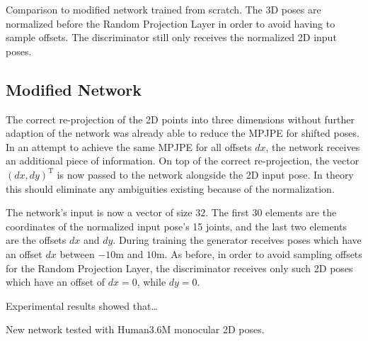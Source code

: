 Comparison to modified network trained from scratch.
The 3D poses are normalized before the Random Projection Layer in order to avoid having to sample offsets.
The discriminator still only receives the normalized 2D input poses.


\subsection{Modified Network}
The correct re-projection of the 2D points into three dimensions without further adaption of the network was already able to reduce the MPJPE for shifted poses.
In an attempt to achieve the same MPJPE for all offsets $dx$, the network receives an additional piece of information.
On top of the correct re-projection, the vector $(dx, dy)^\mathrm{T}$ is now passed to the network alongside the 2D input pose.
In theory this should eliminate any ambiguities existing because of the normalization.

The network's input is now a vector of size $32$. 
The first $30$ elements are the coordinates of the normalized input pose's 15 joints, and the last two elements are the offsets $dx$ and $dy$.
During training the generator receives poses which have an offset $dx$ between $-10$m and $10$m.
As before, in order to avoid sampling offsets for the Random Projection Layer, the discriminator receives only such 2D poses which have an offset of $dx = 0$, while $dy = 0$.

Experimental results showed that\dots

New network tested with Human3.6M monocular 2D poses.
